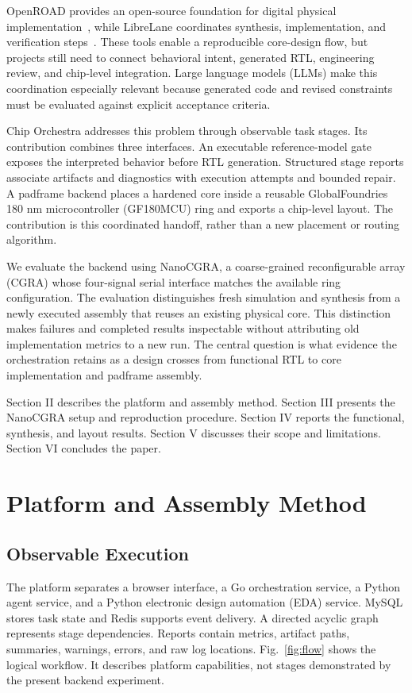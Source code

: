 \documentclass[conference,letterpaper]{IEEEtran}
\begin{document}
OpenROAD provides an open-source foundation for digital physical implementation~\cite{openroad}, while LibreLane coordinates synthesis, implementation, and verification steps~\cite{librelane}. These tools enable a reproducible core-design flow, but projects still need to connect behavioral intent, generated RTL, engineering review, and chip-level integration. Large language models (LLMs) make this coordination especially relevant because generated code and revised constraints must be evaluated against explicit acceptance criteria.

Chip Orchestra addresses this problem through observable task stages. Its contribution combines three interfaces. An executable reference-model gate exposes the interpreted behavior before RTL generation. Structured stage reports associate artifacts and diagnostics with execution attempts and bounded repair. A padframe backend places a hardened core inside a reusable GlobalFoundries 180 nm microcontroller (GF180MCU) ring and exports a chip-level layout. The contribution is this coordinated handoff, rather than a new placement or routing algorithm.

We evaluate the backend using NanoCGRA, a coarse-grained reconfigurable array (CGRA) whose four-signal serial interface matches the available ring configuration. The evaluation distinguishes fresh simulation and synthesis from a newly executed assembly that reuses an existing physical core. This distinction makes failures and completed results inspectable without attributing old implementation metrics to a new run. The central question is what evidence the orchestration retains as a design crosses from functional RTL to core implementation and padframe assembly.

Section II describes the platform and assembly method. Section III presents the NanoCGRA setup and reproduction procedure. Section IV reports the functional, synthesis, and layout results. Section V discusses their scope and limitations. Section VI concludes the paper.

\section{Platform and Assembly Method}
\subsection{Observable Execution}
The platform separates a browser interface, a Go orchestration service, a Python agent service, and a Python electronic design automation (EDA) service. MySQL stores task state and Redis supports event delivery. A directed acyclic graph represents stage dependencies. Reports contain metrics, artifact paths, summaries, warnings, errors, and raw log locations. Fig.~\ref{fig:flow} shows the logical workflow. It describes platform capabilities, not stages demonstrated by the present backend experiment.
\end{document}
